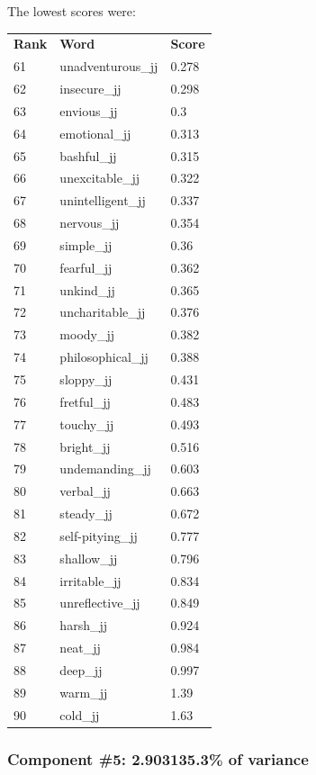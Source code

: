 \documentclass[10pt,letterpaper]{book}
\begin{document}
The lowest scores were:
\begin{tabular}{ l l l }
        \textbf{Rank} & \textbf{Word} & \textbf{Score} \\
        61 & unadventurous\_jj & 0.278 \\
        62 & insecure\_jj & 0.298 \\
        63 & envious\_jj & 0.3 \\
        64 & emotional\_jj & 0.313 \\
        65 & bashful\_jj & 0.315 \\
        66 & unexcitable\_jj & 0.322 \\
        67 & unintelligent\_jj & 0.337 \\
        68 & nervous\_jj & 0.354 \\
        69 & simple\_jj & 0.36 \\
        70 & fearful\_jj & 0.362 \\
        71 & unkind\_jj & 0.365 \\
        72 & uncharitable\_jj & 0.376 \\
        73 & moody\_jj & 0.382 \\
        74 & philosophical\_jj & 0.388 \\
        75 & sloppy\_jj & 0.431 \\
        76 & fretful\_jj & 0.483 \\
        77 & touchy\_jj & 0.493 \\
        78 & bright\_jj & 0.516 \\
        79 & undemanding\_jj & 0.603 \\
        80 & verbal\_jj & 0.663 \\
        81 & steady\_jj & 0.672 \\
        82 & self-pitying\_jj & 0.777 \\
        83 & shallow\_jj & 0.796 \\
        84 & irritable\_jj & 0.834 \\
        85 & unreflective\_jj & 0.849 \\
        86 & harsh\_jj & 0.924 \\
        87 & neat\_jj & 0.984 \\
        88 & deep\_jj & 0.997 \\
        89 & warm\_jj & 1.39 \\
        90 & cold\_jj & 1.63 \\
\end{tabular}
\subsubsection{Component \#5: 2.903135.3\% of variance}
\end{document}
